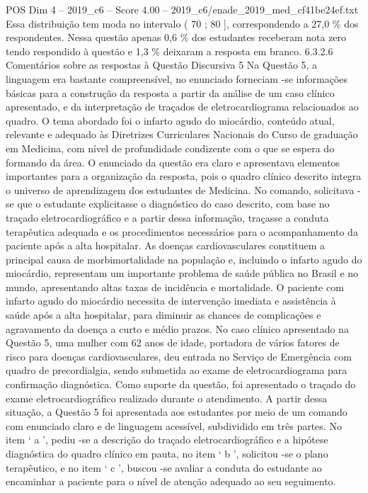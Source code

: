 \begin{textsample}{POS Dim 4 – 2019\_c6 – Score 4.00 – 2019\_c6/enade\_2019\_med\_cf41be24ef.txt}
Essa distribuição tem moda no intervalo ( 70 ; 80 ], correspondendo a 27,0 \% dos respondentes.
Nessa questão apenas 0,6 \% dos estudantes receberam nota zero tendo respondido à questão e 1,3 \% deixaram a resposta em branco. 6.3.2.6 Comentários sobre as respostas à Questão Discursiva 5 Na Questão 5, a linguagem era bastante compreensível, no enunciado forneciam -se informações básicas para a construção da resposta a partir da análise de um caso clínico apresentado, e da interpretação de traçados de eletrocardiograma relacionados ao quadro.
O tema abordado foi o infarto agudo do miocárdio, conteúdo atual, relevante e adequado às Diretrizes Curriculares Nacionais do Curso de graduação em Medicina, com nível de profundidade condizente com o que se espera do formando da área.
O enunciado da questão era claro e apresentava elementos importantes para a organização da resposta, pois o quadro clínico descrito integra o universo de aprendizagem dos estudantes de Medicina.
No comando, solicitava -se que o estudante explicitasse o diagnóstico do caso descrito, com base no traçado eletrocardiográfico e a partir dessa informação, traçasse a conduta terapêutica adequada e os procedimentos necessários para o acompanhamento da paciente após a alta hospitalar.
As doenças cardiovasculares constituem a principal causa de morbimortalidade na população e, incluindo o infarto agudo do miocárdio, representam um importante problema de saúde pública no Brasil e no mundo, apresentando altas taxas de incidência e mortalidade.
O paciente com infarto agudo do miocárdio necessita de intervenção imediata e assistência à saúde após a alta hospitalar, para diminuir as chances de complicações e agravamento da doença a curto e médio prazos.
No caso clínico apresentado na Questão 5, uma mulher com 62 anos de idade, portadora de vários fatores de risco para doenças cardiovasculares, deu entrada no Serviço de Emergência com quadro de precordialgia, sendo submetida ao exame de eletrocardiograma para confirmação diagnóstica.
Como suporte da questão, foi apresentado o traçado do exame eletrocardiográfico realizado durante o atendimento.
A partir dessa situação, a Questão 5 foi apresentada aos estudantes por meio de um comando com enunciado claro e de linguagem acessível, subdividido em três partes.
No item ‘ a ’, pediu -se a descrição do traçado eletrocardiográfico e a hipótese diagnóstica do quadro clínico em pauta, no item ‘ b ’, solicitou -se o plano terapêutico, e no item ‘ c ’, buscou -se avaliar a conduta do estudante ao encaminhar a paciente para o nível de atenção adequado ao seu seguimento.

\end{textsample}
